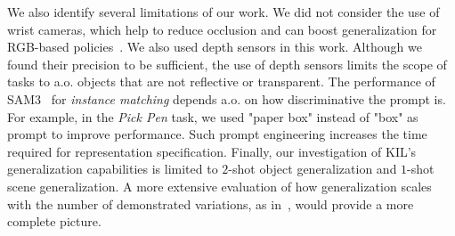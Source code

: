 \documentclass[letterpaper, 10 pt, conference]{ieeeconf}  %
\newcommand{\thomas}[1]{{\color{ForestGreen} TL: #1}}
\begin{document}
We also identify several limitations of our work.
We did not consider the use of wrist cameras, which help to reduce occlusion and can boost generalization for RGB-based policies~\cite{hsu2022wrist-cam-policy-benefits}. We also used depth sensors in this work. Although we found their precision to be sufficient, the use of depth sensors limits the scope of tasks to a.o. objects that are not reflective or transparent. %
The performance of SAM3~\cite{carion2025sam3} for \textit{instance matching} depends a.o. on how discriminative the prompt is. For example, in the \textit{Pick Pen} task, we used "paper box" instead of "box" as prompt to improve performance. Such prompt engineering increases the time required for representation specification.
Finally, our investigation of KIL's generalization capabilities is limited to $2$-shot object generalization and $1$-shot scene generalization. A more extensive evaluation of how generalization scales with the number of demonstrated variations, as in~\cite{lin2025imitation_scaling_laws}, would provide a more complete picture. 

\end{document}
